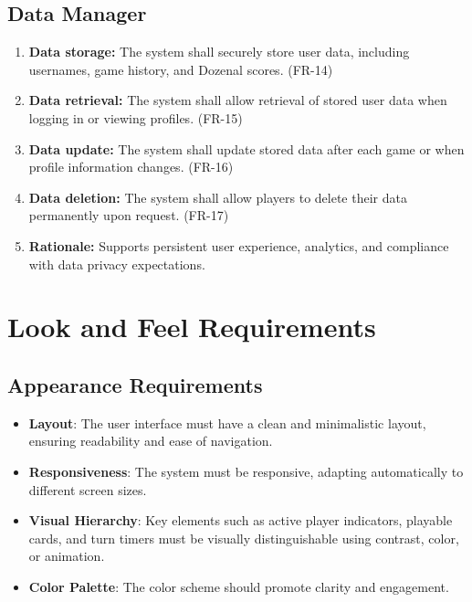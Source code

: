 \documentclass[12pt]{article}
\begin{document}
\subsection{Data Manager}
\begin{enumerate}
    \item \textbf{Data storage:} The system shall securely store user data, including usernames, game history, and Dozenal scores. (FR-14)
    \item \textbf{Data retrieval:} The system shall allow retrieval of stored user data when logging in or viewing profiles. (FR-15)
    \item \textbf{Data update:} The system shall update stored data after each game or when profile information changes. (FR-16)
    \item \textbf{Data deletion:} The system shall allow players to delete their data permanently upon request. (FR-17)
    \item \textbf{Rationale:} Supports persistent user experience, analytics, and compliance with data privacy expectations.
\end{enumerate}

\section{Look and Feel Requirements}
\subsection{Appearance Requirements}
	\begin{itemize}
		\item \textbf{Layout}: The user interface must have a clean and minimalistic layout, ensuring readability and ease of navigation.
		\item \textbf{Responsiveness}: The system must be responsive, adapting automatically to different screen sizes.
		\item \textbf{Visual Hierarchy}: Key elements such as active player indicators, playable cards, and turn timers must be visually distinguishable using contrast, color, or animation.
		\item \textbf{Color Palette}: The color scheme should promote clarity and engagement.
	\end{itemize}
\end{document}
